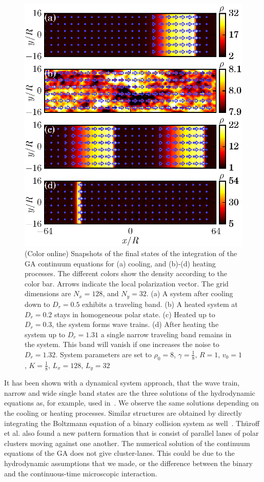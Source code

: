 \documentclass[reprint,floatfix,amsmath,amssymb,aps,pre,showkeys,showpacs,superscriptaddress]{revtex4-1}
\newcommand{\hl}[1]{\textcolor{hlcolor}{#1}}
\begin{document}
\begin{figure}
	\centering
	\includegraphics[width=\columnwidth]{Fig6_snapshots-ga}
	\caption{(Color online) Snapshots \hl{of the final states of the} integration of the GA continuum equations for (a) cooling, and (b)-(d) heating \hl{processes}. The different colors \hl{show} the density according to the color bar. Arrows indicate the local polarization vector. The grid dimensions are $N_x=128$, and $N_y=32$. (a) A system after cooling down to \hl{$D_r=0.5$} exhibits a traveling band. (b) A heated system at $D_r=0.2$ stays in homogeneous polar state. (c) Heated up to $D_r=0.3$, the system \hl{forms} wave trains. (d) After heating the system up to \hl{$D_r=1.31$} a single narrow traveling band \hl{remains} in the system. This band will vanish if one increases the noise to \hl{$D_r=1.32$}. System parameters are set to $\rho_0=8$, $\gamma=\tfrac{1}{8}$, $R=1$, $v_0=1$, $K=\tfrac{1}{8}$, $L_x=128$, $L_y=32$}
\label{fig:snapshots-ga}
\end{figure}

\hl{It has been shown with a dynamical system approach, that the wave train, narrow and wide single band states are the three solutions of the hydrodynamic equations as, for example, used in~\cite{caussin2014}. We observe the same solutions depending on the cooling or heating processes.} Similar structures are obtained by directly integrating the Boltzmann equation of a binary collision system as well~\cite{thuroff2014numerical}. \hl{Th{\"u}roff et al.} also found a new pattern formation that is consist of parallel lanes of polar clusters moving against one another. The numerical solution of the continuum equations of the GA does not give cluster-lanes. This could be due to the hydrodynamic assumptions that we made, or the difference between the binary and the continuous-time microscopic interaction.
\end{document}
